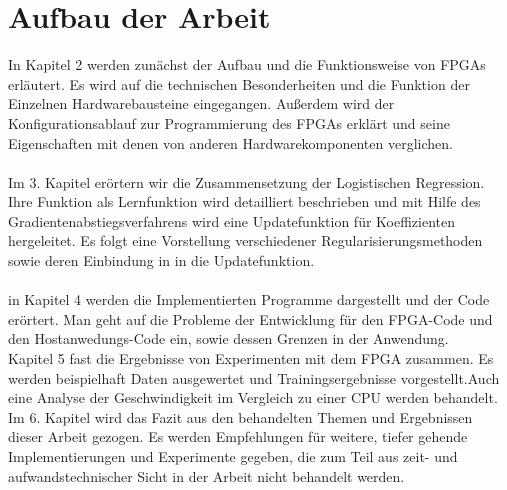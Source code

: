 \section{Aufbau der Arbeit}
In Kapitel 2 werden zunächst der Aufbau und die Funktionsweise von FPGAs erläutert. Es wird auf die technischen Besonderheiten und die Funktion der Einzelnen Hardwarebausteine eingegangen. Außerdem wird der Konfigurationsablauf zur Programmierung des FPGAs erklärt und seine Eigenschaften mit denen von anderen Hardwarekomponenten verglichen.\\\\
Im 3. Kapitel erörtern wir die Zusammensetzung der Logistischen Regression. Ihre Funktion als Lernfunktion wird detailliert beschrieben und mit Hilfe des Gradientenabstiegsverfahrens wird eine Updatefunktion für Koeffizienten hergeleitet. Es folgt eine Vorstellung verschiedener Regularisierungsmethoden sowie deren Einbindung in in die Updatefunktion.\\\\
in Kapitel 4 werden die Implementierten Programme dargestellt und der Code erörtert. Man geht auf die Probleme der Entwicklung für den FPGA-Code und den Hostanwedungs-Code ein, sowie dessen Grenzen in der Anwendung.\\
Kapitel 5 fast die Ergebnisse von Experimenten mit dem FPGA zusammen. Es werden beispielhaft Daten ausgewertet und Trainingsergebnisse vorgestellt.Auch eine Analyse der Geschwindigkeit im Vergleich zu einer CPU werden behandelt. \\Im 6. Kapitel wird das Fazit aus den behandelten Themen und Ergebnissen dieser Arbeit gezogen. Es werden Empfehlungen für weitere, tiefer gehende Implementierungen und Experimente gegeben, die zum Teil aus zeit- und aufwandstechnischer Sicht in der Arbeit nicht behandelt werden.

